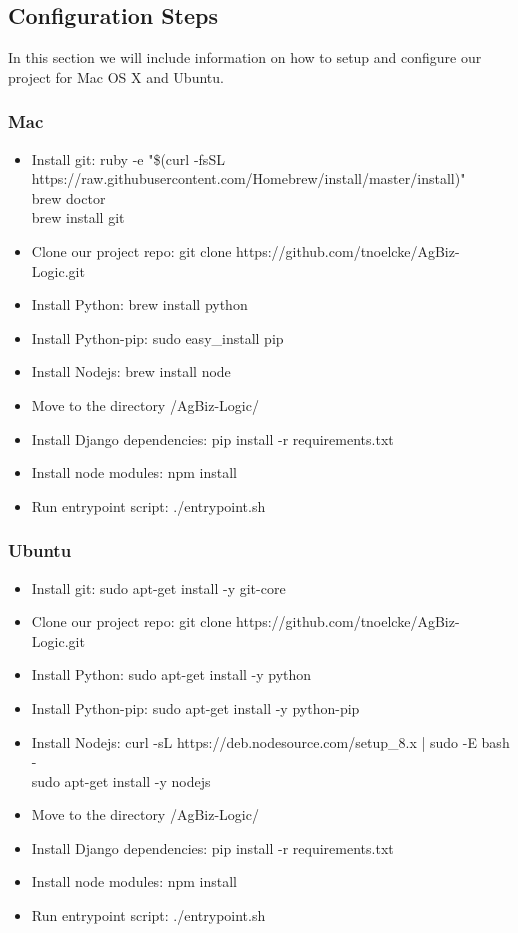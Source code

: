 \documentclass[onecolumn, draftclsnofoot,10pt, compsoc]{article}
\begin{document}
    \subsection{Configuration Steps}
        In this section we will include information on how to setup and configure our project for Mac OS X and Ubuntu.
        \subsubsection{Mac}
            \begin{itemize}
                \item Install git: ruby -e "\$(curl -fsSL https://raw.githubusercontent.com/Homebrew/install/master/install)" \\
                brew doctor \\
                brew install git \\
                \item Clone our project repo: git clone https://github.com/tnoelcke/AgBiz-Logic.git 
                \item Install Python: brew install python
                \item Install Python-pip: sudo easy\_install pip
                \item Install Nodejs: brew install node
                \item Move to the directory /AgBiz-Logic/
                \item Install Django dependencies: pip install -r requirements.txt
                \item Install node modules: npm install
                \item Run entrypoint script: ./entrypoint.sh
            \end{itemize}
        \subsubsection{Ubuntu}
            \begin{itemize}
                \item Install git: sudo apt-get install -y git-core
                \item Clone our project repo: git clone https://github.com/tnoelcke/AgBiz-Logic.git
                \item Install Python: sudo apt-get install -y python
                \item Install Python-pip: sudo apt-get install -y python-pip
                \item Install Nodejs: curl -sL https://deb.nodesource.com/setup\_8.x | sudo -E bash - \\
                      sudo apt-get install -y nodejs
                \item Move to the directory /AgBiz-Logic/
                \item Install Django dependencies: pip install -r requirements.txt
                \item Install node modules: npm install
                \item Run entrypoint script: ./entrypoint.sh
            \end{itemize}
    
\end{document}
